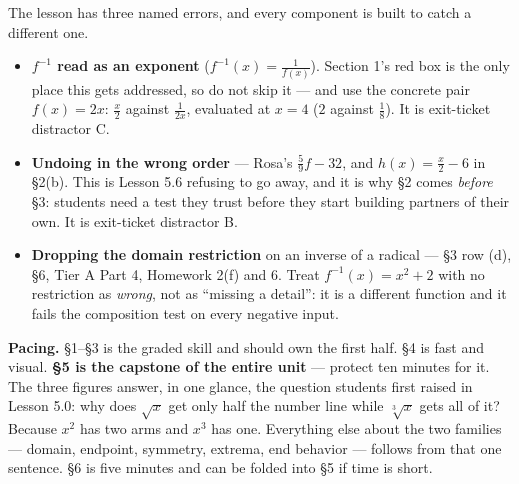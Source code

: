 \documentclass[10pt]{article}
\begin{document}
\begin{teachernote}
\small The lesson has three named errors, and every component is built to catch a different one.
\begin{itemize}[leftmargin=1.3em, nosep]
  \item \textbf{$f^{-1}$ read as an exponent} ($f^{-1}(x)=\frac{1}{f(x)}$). Section 1's red box is
        the only place this gets addressed, so do not skip it --- and use the concrete pair
        $f(x)=2x$: $\frac{x}{2}$ against $\frac{1}{2x}$, evaluated at $x=4$ ($2$ against $\frac18$).
        It is exit-ticket distractor C.
  \item \textbf{Undoing in the wrong order} --- Rosa's $\frac59f-32$, and $h(x)=\frac{x}{2}-6$ in
        \S2(b). This is Lesson 5.6 refusing to go away, and it is why \S2 comes \emph{before} \S3:
        students need a test they trust before they start building partners of their own. It is
        exit-ticket distractor B.
  \item \textbf{Dropping the domain restriction} on an inverse of a radical --- \S3 row (d),
        \S6, Tier A Part 4, Homework 2(f) and 6. Treat $f^{-1}(x)=x^{2}+2$ with no restriction as
        \emph{wrong}, not as ``missing a detail'': it is a different function and it fails the
        composition test on every negative input.
\end{itemize}
\textbf{Pacing.} \S1--\S3 is the graded skill and should own the first half. \S4 is fast and visual.
\textbf{\S5 is the capstone of the entire unit} --- protect ten minutes for it. The three figures
answer, in one glance, the question students first raised in Lesson 5.0: why does $\sqrt{x}$ get
only half the number line while $\sqrt[3]{x}$ gets all of it? Because $x^{2}$ has two arms and
$x^{3}$ has one. Everything else about the two families --- domain, endpoint, symmetry, extrema,
end behavior --- follows from that one sentence. \S6 is five minutes and can be folded into \S5 if
time is short.
\end{teachernote}
\end{document}
